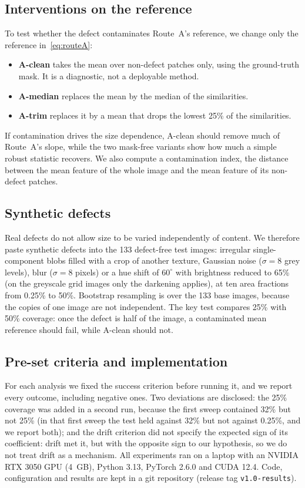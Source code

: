 \subsection{Interventions on the reference}
\label{sec:interventions}
To test whether the defect contaminates Route~A's reference, we change only
the reference in~\eqref{eq:routeA}:
\begin{itemize}
  \item \textbf{A-clean} takes the mean over non-defect patches only, using
  the ground-truth mask. It is a diagnostic, not a deployable method.
  \item \textbf{A-median} replaces the mean by the median of the similarities.
  \item \textbf{A-trim} replaces it by a mean that drops the lowest 25\% of
  the similarities.
\end{itemize}
If contamination drives the size dependence, A-clean should remove much of
Route~A's slope, while the two mask-free variants show how much a simple
robust statistic recovers. We also compute a contamination index, the
distance between the mean feature of the whole image and the mean feature of
its non-defect patches.

\subsection{Synthetic defects}
Real defects do not allow size to be varied independently of content.
We therefore paste synthetic defects into the 133 defect-free test images:
irregular single-component blobs filled with a crop of another texture,
Gaussian noise ($\sigma=8$ grey levels), blur ($\sigma=8$ pixels) or a hue
shift of $60^\circ$ with brightness reduced to 65\% (on the greyscale grid
images only the darkening applies), at ten area fractions from 0.25\% to
50\%. Bootstrap resampling is over the 133 base images, because the copies of
one image are not independent. The key test compares 25\% with 50\% coverage:
once the defect is half of the image, a contaminated mean reference should
fail, while A-clean should not.

\subsection{Pre-set criteria and implementation}
For each analysis we fixed the success criterion before running it, and we
report every outcome, including negative ones. Two deviations are disclosed:
the 25\% coverage was added in a second run, because the first sweep
contained 32\% but not 25\% (in that first sweep the test held against 32\%
but not against 0.25\%, and we report both); and the drift criterion did not
specify the expected sign of its coefficient: drift met it, but with the
opposite sign to our hypothesis, so we do not treat drift as a mechanism. All experiments ran on a laptop with an
NVIDIA RTX 3050 GPU (4~GB), Python 3.13, PyTorch 2.6.0 and CUDA 12.4. Code,
configuration and results are kept in a git repository (release tag
\texttt{v1.0-results}).

